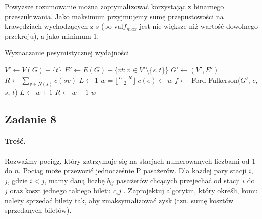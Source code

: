 Powyższe rozumowanie można zoptymalizować korzystając z 
binarnego przeszukiwania. Jako maksimum przyjmujemy
sumę przepustowości na krawędziach
wychodzących z $s$ 
(bo $\text{val} f_{max}$ jest nie większe niż
wartość dowolnego przekroju), a jako minimum 1.

\begin{algorithm}[H]
	\caption{Wyznaczanie pesymistycznej wydajności}
	\begin{algorithmic}[1]
		\State $V' \gets V(G) + \{t\}$
		\State $E' \gets E(G) + \{vt : v \in V' \setminus \{s, t\} \}$
		\State $G' \gets (V', E')$
		\State $R \gets \sum_{v \in N(s)}c(sv)$
		\State $L \gets 1$
		\State $w = \lfloor \frac{L + R}{2} \rfloor$
		\State $c(e) \gets w$
		\EndFor 
		\State $f \gets$ Ford-Fulkerson($G'$, $c$, $s$, $t$)
		\State $L \gets w + 1$
		\Else
		\State $R \gets w - 1$
		\EndIf
		\EndWhile
		\State \Return $w$
		\EndProcedure
	\end{algorithmic}
	\label{zad46}
\end{algorithm}

\subsection{Zadanie 8}
\paragraph{Treść.} Rozważmy pociąg, który zatrzymuje się na stacjach 
numerowanych liczbami od 1 do $n$. Pociag może
przewozić jednocześnie P pasażerów. Dla każdej pary stacji 
$i$, $j$, gdzie $i < j$, mamy daną liczbę $b_{ij}$ pasażerów chcących
przejechać od stacji $i$ do $j$ oraz koszt jednego takiego biletu $c_ij$ .
Zaprojektuj algorytm, który określi, komu należy sprzedać bilety tak, 
aby zmaksymalizować zysk (tzn. sumę kosztów
sprzedanych biletów).